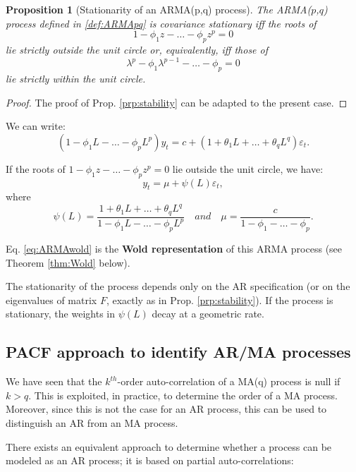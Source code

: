 \documentclass[
  12pt,
]{book}
\newtheorem{proposition}{Proposition}[chapter]
\theoremstyle{definition}
\theoremstyle{definition}
\theoremstyle{definition}
\theoremstyle{definition}
\theoremstyle{remark}
\begin{document}
\begin{proposition}[Stationarity of an ARMA(p,q) process]
\protect\hypertarget{prp:statioARMApq}{}\label{prp:statioARMApq}The ARMA(\(p\),\(q\)) process defined in \ref{def:ARMApq} is covariance stationary iff the roots of
\[
1 - \phi_1 z - \dots - \phi_p z^p=0
\]
lie strictly outside the unit circle or, equivalently, iff those of
\[
\lambda^p - \phi_1 \lambda^{p-1} - \dots - \phi_p=0
\]
lie strictly within the unit circle.
\end{proposition}

\begin{proof}
The proof of Prop. \ref{prp:stability} can be adapted to the present case.
\end{proof}

We can write:
\[
(1 - \phi_1 L - \dots - \phi_p L^p)y_t = c + (1 + \theta_1 L + \dots + \theta_q L^q)\varepsilon_t.
\]

If the roots of \(1 - \phi_1 z - \dots - \phi_p z^p=0\) lie outside the unit circle, we have:
\begin{equation}
y_t = \mu + \psi(L)\varepsilon_t,\label{eq:ARMAwold}
\end{equation}
where
\[
\psi(L) = \frac{1 + \theta_1 L + \dots + \theta_q L^q}{1 - \phi_1 L - \dots - \phi_p L^p} \quad and \quad \mu = \dfrac{c}{1-\phi_1 -\dots - \phi_p}.
\]

Eq. \eqref{eq:ARMAwold} is the \textbf{Wold representation} of this ARMA process (see Theorem \ref{thm:Wold} below).

The stationarity of the process depends only on the AR specification (or on the eigenvalues of matrix \(F\), exactly as in Prop. \ref{prp:stability}). If the process is stationary, the weights in \(\psi(L)\) decay at a geometric rate.

\hypertarget{PACFapproach}{%
\subsection{PACF approach to identify AR/MA processes}\label{PACFapproach}}

We have seen that the \(k^{th}\)-order auto-correlation of a MA(q) process is null if \(k>q\). This is exploited, in practice, to determine the order of a MA process. Moreover, since this is not the case for an AR process, this can be used to distinguish an AR from an MA process.

There exists an equivalent approach to determine whether a process can be modeled as an AR process; it is based on partial auto-correlations:
\end{document}
